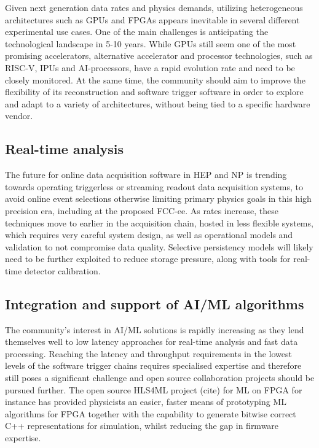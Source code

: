 \documentclass[10pt,a4paper]{article}
\begin{document}
Given next generation data rates and physics demands, utilizing
heterogeneous architectures such as GPUs and FPGAs appears inevitable in
several different experimental use cases. One of the main challenges is
anticipating the technological landscape in 5-10 years. While GPUs still
seem one of the most promising accelerators, alternative accelerator and
processor technologies, such as RISC-V, IPUs and AI-processors, have a
rapid evolution rate and need to be closely monitored. At the same time,
the community should aim to improve the flexibility of its
reconstruction and software trigger software in order to explore and
adapt to a variety of architectures, without being tied to a specific
hardware vendor.

\subsection{Real-time analysis}\label{real-time-analysis}

The future for online data acquisition software in HEP and NP is
trending towards operating triggerless or streaming readout data
acquisition systems, to avoid online event selections otherwise limiting
primary physics goals in this high precision era, including at the
proposed FCC-ee. As rates increase, these techniques move to earlier in
the acquisition chain, hosted in less flexible systems, which requires
very careful system design, as well as operational models and validation
to not compromise data quality. Selective persistency models will likely
need to be further exploited to reduce storage pressure, along with
tools for real-time detector calibration.

\subsection{Integration and support of AI/ML
algorithms}\label{integration-and-support-of-aiml-algorithms}

The community's interest in AI/ML solutions is rapidly increasing as
they lend themselves well to low latency approaches for real-time
analysis and fast data processing. Reaching the latency and throughput
requirements in the lowest levels of the software trigger chains
requires specialised expertise and therefore still poses a significant
challenge and open source collaboration projects should be pursued
further. The open source HLS4ML project (cite) for ML on FPGA for
instance has provided physicists an easier, faster means of prototyping
ML algorithms for FPGA together with the capability to generate bitwise
correct C++ representations for simulation, whilst reducing the gap in
firmware expertise.
\end{document}
